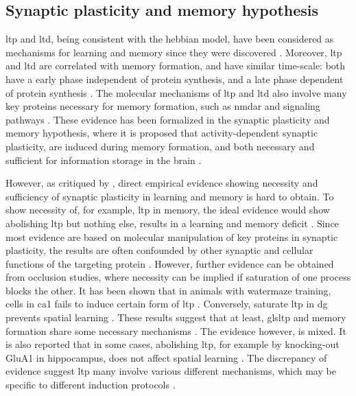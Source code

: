 \subsection{Synaptic plasticity and memory hypothesis}
\Gls{ltp} and \gls{ltd}, being consistent with the hebbian model, have been considered as mechanisms for learning and memory since they were discovered \citep{morris90, bliss93, shors97, martin00}. Moreover, \gls{ltp} and \gls{ltd} are correlated with memory formation, and have similar time-scale: both have a early phase independent of protein synthesis, and a late phase dependent of protein synthesis \citep{abel01, reymann07}. The molecular mechanisms of \gls{ltp} and \gls{ltd} also involve many key proteins necessary for memory formation, such as \gls{nmdar} and  signaling pathways \citep{martin00}. These evidence has been formalized in the synaptic plasticity and memory hypothesis, where it is proposed that activity-dependent synaptic plasticity, are induced during memory formation, and both necessary and sufficient for information storage in the brain \citep{martin00}.  

However, as critiqued by \citet{neves08}, direct empirical evidence showing necessity and sufficiency of synaptic plasticity in learning and memory is hard to obtain. To show necessity of, for example, \gls{ltp} in memory, the ideal evidence would show abolishing \gls{ltp} but nothing else, results in a learning and memory deficit \citep{neves08}. Since most evidence are based on molecular manipulation of key proteins in synaptic plasticity, the results are often confounded by other synaptic and cellular functions of the targeting protein \citep{neves08}. However, further evidence can be obtained from occlusion studies, where necessity can be implied if saturation of one process blocks the other. It has been shown that in animals with watermaze training, cells in \gls{ca1} fails to induce certain form of \gls{ltp} \citep{habib14}. Conversely, saturate \gls{ltp} in \gls{dg} prevents spatial learning \citep{moser98}. These results suggest that at least, gls{ltp} and memory formation share some necessary mechanisms \citep{takeuchi14}. The evidence however, is mixed. It is also reported that in some cases, abolishing \gls{ltp}, for example by knocking-out GluA1 in hippocampus, does not affect spatial learning \citep{zamanillo99}. The discrepancy of evidence suggest \gls{ltp} many involve various different mechanisms, which may be specific to different induction protocols \citep{neves08}.

